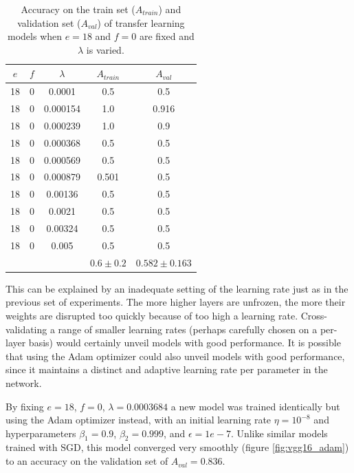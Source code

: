 \begin{table}[ht]
\centering
\begin{tabular}{ |c|c|c|c|c| }
\hline
$e$ & $f$ & $\lambda$ & $A_{train}$ & $A_{val}$ \\
\hline
18 & 0 & 0.0001 & 0.5 & 0.5 \\
18 & 0 & 0.000154 & 1.0 & 0.916 \\
18 & 0 & 0.000239 & 1.0 & 0.9 \\
18 & 0 & 0.000368 & 0.5 & 0.5 \\
18 & 0 & 0.000569 & 0.5 & 0.5 \\
18 & 0 & 0.000879 & 0.501 & 0.5 \\
18 & 0 & 0.00136 & 0.5 & 0.5 \\
18 & 0 & 0.0021 & 0.5 & 0.5 \\
18 & 0 & 0.00324 & 0.5 & 0.5 \\
18 & 0 & 0.005 & 0.5 & 0.5 \\
\hline
 & & & $0.6\pm0.2$ & $0.582\pm0.163$ \\
\hline
\end{tabular}
\caption{Accuracy on the train set ($A_{train}$) and validation set ($A_{val}$) of transfer learning models when $e = 18$ and $f = 0$ are fixed and $\lambda$ is varied.}
\label{table:vgg16_finetuning_0}
\end{table}

This can be explained by an inadequate setting of the learning rate just as in the previous set of experiments. The more higher layers are unfrozen, the more their weights are disrupted too quickly because of too high a learning rate. Cross-validating a range of smaller learning rates (perhaps carefully chosen on a per-layer basis) would certainly unveil models with good performance. It is possible that using the Adam optimizer could also unveil models with good performance, since it maintains a distinct and adaptive learning rate per parameter in the network.

By fixing $e = 18$, $f = 0$, $\lambda = 0.0003684$ a new model was trained identically but using the Adam optimizer instead, with an initial learning rate $\eta = 10^{-8}$ and hyperparameters $\beta_1=0.9$, $\beta_2=0.999$, and $\epsilon=1e-{7}$. Unlike similar models trained with \ac{SGD}, this model converged very smoothly (figure \ref{fig:vgg16_adam}) to an accuracy on the validation set of $A_{val} = 0.836$.


